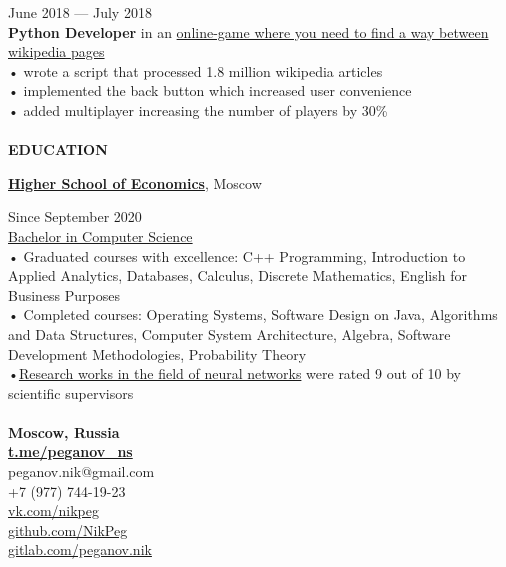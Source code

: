 \documentclass{article}
\begin{document}
\begin{vwcol}[widths={0.8,0.2},
 sep=.8cm, justify=flush,rule=0pt,indent=1em]
\begin{Large}
\end{Large}
\hspace{85pt}June 2018 — July 2018\\
\textbf{Python Developer} in an \href{https://github.com/igoose1/wikirace}{online-game where you need to find a way between wikipedia pages}\\
• wrote a script that processed 1.8 million wikipedia articles\\
• implemented the back button which increased user convenience\\
• added multiplayer increasing the number of players by 30\%\\
\\
\noindent\textcolor[rgb]{0.1255,0.2902,0.7843}{\textbf{\Large{EDUCATION}}}\\
\begin{Large}
\textbf{\href{https://hse.ru/}{Higher School of Economics}}, Moscow
\end{Large}
\hspace{75pt}Since September 2020\\
\href{https://cs.hse.ru/}{Bachelor in Computer Science}\\
• Graduated courses with excellence: C++ Programming, Introduction to Applied Analytics, Databases, Calculus, Discrete Mathematics, English for Business Purposes\\
• Completed courses: Operating Systems, Software Design on Java, Algorithms and Data Structures, Computer System Architecture, Algebra, Software Development Methodologies, Probability Theory\\
•\href{https://github.com/NikPeg/synchronization-of-neuromorphic-networks-of-the-close-world-from-the-point-of-view-of-complexes} {Research works in the field of neural networks} were rated 9 out of 10 by scientific supervisors\\
\newpage
~\\
\noindent\textbf{Moscow, Russia}\\
\noindent\textbf{\textcolor[rgb]{0.1255,0.2902,0.7843}{\href{https://t.me/peganov\_ns}{t.me/peganov\_ns}}}\\
peganov.nik@gmail.com\\
+7 (977) 744-19-23\\
\href{https://vk.com/nikpeg}{vk.com/nikpeg}\\
\href{https://github.com/NikPeg}{github.com/NikPeg}\\
\href{https://gitlab.com/peganov.nik}{gitlab.com/peganov.nik}\\

\end{vwcol}
\end{document}
